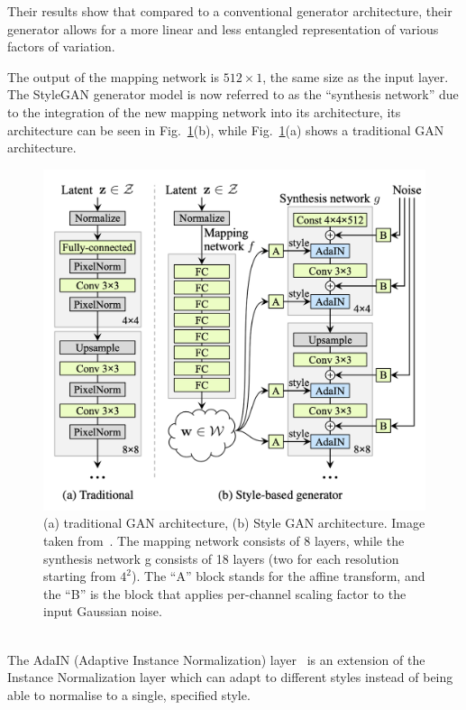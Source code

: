 %
\noindent Their results show that compared to a conventional generator architecture, their generator allows for a more linear and less entangled representation of various factors of variation.

\noindent The output of the mapping network is $512 \times 1$, the same size as the input layer. The StyleGAN generator model is now referred to as the “synthesis network” due to the integration of the new mapping network into its architecture, its architecture can be seen in Fig.~\ref{fig:StyleGAN architecture}(b), while Fig.~\ref{fig:StyleGAN architecture}(a) shows a traditional GAN architecture.
\begin{figure}[!ht]
\centering
  \includegraphics[scale=0.5]{figures/styleGAN-generator.png}
  \caption{(a) traditional GAN architecture, (b) Style GAN architecture. Image taken from~\cite{StyleGAN}. The mapping network consists of \num{8} layers, while the synthesis network g consists of 18 layers (two for each resolution starting from $4^2$). The “A” block stands for the affine transform, and the “B” is the block that applies per-channel scaling factor to the input Gaussian noise.}
  \label{fig:StyleGAN architecture}
\end{figure}
\\
%
\noindent The AdaIN (Adaptive Instance Normalization) layer~\cite{ArbitraryStyleTransfer} is an extension of the Instance Normalization layer which can adapt to different styles instead of being able to normalise to a single, specified style. 
